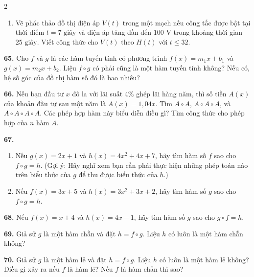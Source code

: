 \begin{multicols}{2}
\vfill\null
\columnbreak

\begin{enumerate}[label=(\alph*),leftmargin=*,itemsep=1pt,topsep=2pt,resume]
    \item Vẽ phác thảo đồ thị điện áp $V(t)$ trong một mạch nếu công tắc được bật tại thời điểm $t = 7\text{ giây}$ và điện áp tăng dần đến $100\text{ V}$ trong khoảng thời gian $25\text{ giây}$. Viết công thức cho $V(t)$ theo $H(t)$ với $t \leqslant 32$.
\end{enumerate}

\noindent
\textbf{65.} Cho $f$ và $g$ là các hàm tuyến tính có phương trình $f(x) = m_1x + b_1$ và $g(x) = m_2x + b_2$. Liệu $f \circ g$ có phải cũng là một hàm tuyến tính không? Nếu có, hệ số góc của đồ thị hàm số đó là bao nhiêu?

\vspace{2pt}
\noindent
\textbf{66.} Nếu bạn đầu tư $x$ đô la với lãi suất $4\%$ ghép lãi hàng năm, thì số tiền $A(x)$ của khoản đầu tư sau một năm là $A(x) = 1{,}04x$. Tìm $A \circ A$, $A \circ A \circ A$, và $A \circ A \circ A \circ A$. Các phép hợp hàm này biểu diễn điều gì? Tìm công thức cho phép hợp của $n$ hàm $A$.

\vspace{2pt}
\noindent
\textbf{67.} 
\begin{enumerate}[label=(\alph*),leftmargin=*,itemsep=1pt,topsep=2pt]
    \item Nếu $g(x) = 2x + 1$ và $h(x) = 4x^2 + 4x + 7$, hãy tìm hàm số $f$ sao cho $f \circ g = h$. (Gợi ý: Hãy nghĩ xem bạn cần phải thực hiện những phép toán nào trên biểu thức của $g$ để thu được biểu thức của $h$.)
    \item Nếu $f(x) = 3x + 5$ và $h(x) = 3x^2 + 3x + 2$, hãy tìm hàm số $g$ sao cho $f \circ g = h$.
\end{enumerate}

\noindent
\textbf{68.} Nếu $f(x) = x + 4$ và $h(x) = 4x - 1$, hãy tìm hàm số $g$ sao cho $g \circ f = h$.

\vspace{2pt}
\noindent
\textbf{69.} Giả sử $g$ là một hàm chẵn và đặt $h = f \circ g$. Liệu $h$ có luôn là một hàm chẵn không?

\vspace{2pt}
\noindent
\textbf{70.} Giả sử $g$ là một hàm lẻ và đặt $h = f \circ g$. Liệu $h$ có luôn là một hàm lẻ không? Điều gì xảy ra nếu $f$ là hàm lẻ? Nếu $f$ là hàm chẵn thì sao?


\end{multicols}
